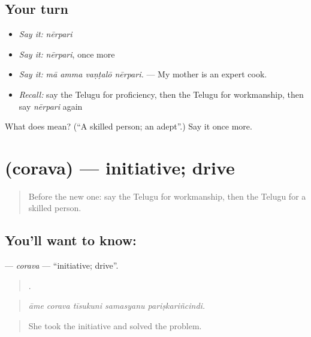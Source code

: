 \subsection*{Your turn}
\begin{itemize}
\raggedright
  \item \emph{Say it:} \emph{nērpari}
  \item \emph{Say it:} \emph{nērpari}, once more
  \item \emph{Say it:} \emph{mā amma vaṇṭalō nērpari.} — My mother is an expert cook.
  \item \emph{Recall:} say the Telugu for proficiency, then the Telugu for workmanship, then say \emph{nērpari} again
\end{itemize}

\begin{tcolorbox}[breakable,colback=teal!4,colframe=teal!35!black,title={Before you move on}]
What does  mean? (\textquotedblleft{}A skilled person; an adept\textquotedblright{}.) Say it once more.
\end{tcolorbox}
\section[\texorpdfstring{\te{చొరవ} (corava)}{చొరవ (corava)}]{ (corava) — initiative; drive}

\label{lesson:TE-C524-corava}



\begin{quote}
Before the new one: say the Telugu for workmanship, then the Telugu for a skilled person.
\end{quote}

\subsection*{You'll want to know: }
\textbf{} — \emph{corava} — \textquotedblleft{}initiative; drive\textquotedblright{}.

\begin{quote}
    .
\end{quote}

\begin{quote}
\emph{āme corava tīsukuni samasyanu pariṣkariñcindi.}
\end{quote}

\begin{quote}
She took the initiative and solved the problem.
\end{quote}

